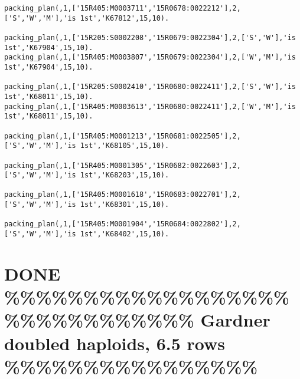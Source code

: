 \documentclass[11pt]{article}
\begin{document}
\begin{verbatim}
packing_plan(,1,['15R405:M0003711','15R0678:0022212'],2,['S','W','M'],'is 1st','K67812',15,10).

packing_plan(,1,['15R205:S0002208','15R0679:0022304'],2,['S','W'],'is 1st','K67904',15,10).
packing_plan(,1,['15R405:M0003807','15R0679:0022304'],2,['W','M'],'is 1st','K67904',15,10).

packing_plan(,1,['15R205:S0002410','15R0680:0022411'],2,['S','W'],'is 1st','K68011',15,10).
packing_plan(,1,['15R405:M0003613','15R0680:0022411'],2,['W','M'],'is 1st','K68011',15,10).

packing_plan(,1,['15R405:M0001213','15R0681:0022505'],2,['S','W','M'],'is 1st','K68105',15,10).

packing_plan(,1,['15R405:M0001305','15R0682:0022603'],2,['S','W','M'],'is 1st','K68203',15,10).

packing_plan(,1,['15R405:M0001618','15R0683:0022701'],2,['S','W','M'],'is 1st','K68301',15,10).

packing_plan(,1,['15R405:M0001904','15R0684:0022802'],2,['S','W','M'],'is 1st','K68402',15,10).
\end{verbatim}




\section{{\bfseries\sffamily DONE} \%\%\%\%\%\%\%\%\%\%\%\%\%\%\%\%\%\%\%\%\%\%\%\%\%\%\%\%\%\% Gardner doubled haploids, 6.5 rows \%\%\%\%\%\%\%\%\%\%\%\%\%\%\%\%}
\label{sec-6}
\end{document}
